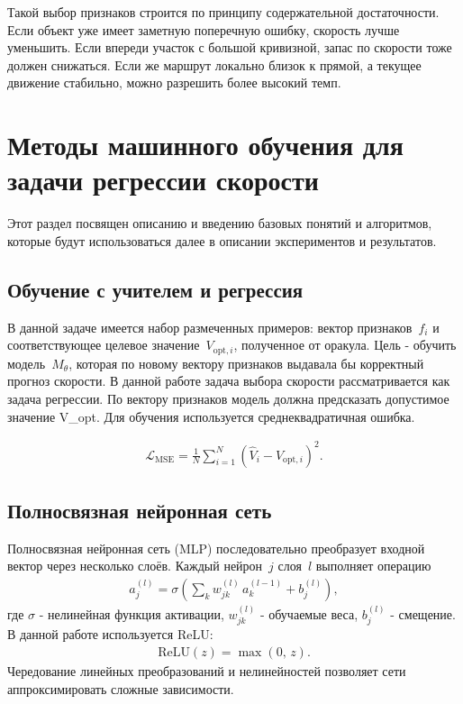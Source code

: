 Такой выбор признаков строится по принципу содержательной достаточности.
Если объект уже имеет заметную поперечную ошибку, скорость лучше уменьшить.
Если впереди участок с большой кривизной, запас по скорости тоже должен снижаться.
Если же маршрут локально близок к прямой, а текущее движение стабильно, можно разрешить более высокий темп.


\section{Методы машинного обучения для задачи регрессии скорости}

Этот раздел посвящен описанию и введению базовых понятий и алгоритмов, которые будут использоваться далее в описании экспериментов и результатов.

\subsection{Обучение с учителем и регрессия}

В данной задаче имеется набор размеченных примеров: вектор признаков~$f_i$ и соответствующее целевое значение~$V_{\mathrm{opt},i}$, полученное от оракула.
Цель - обучить модель~$M_\theta$, которая по новому вектору признаков выдавала бы корректный прогноз скорости.
В данной работе задача выбора скорости рассматривается как задача регрессии.
По вектору признаков модель должна предсказать допустимое значение V_{opt}.
Для обучения используется среднеквадратичная ошибка.

\begin{gather}
    \mathcal{L}_{\mathrm{MSE}} = \frac{1}{N}\sum_{i=1}^N \left(\hat{V}_i - V_{\mathrm{opt},i}\right)^2.
\end{gather}

\subsection{Полносвязная нейронная сеть}

Полносвязная нейронная сеть (MLP) последовательно преобразует входной вектор через несколько слоёв. Каждый нейрон~$j$ слоя~$l$ выполняет операцию
\begin{gather}
    a_j^{(l)} = \sigma\!\left(\sum_k w_{jk}^{(l)}\, a_k^{(l-1)} + b_j^{(l)}\right),
\end{gather}
где $\sigma$ - нелинейная функция активации, $w_{jk}^{(l)}$ - обучаемые веса, $b_j^{(l)}$ - смещение. В данной работе используется ReLU:
\begin{gather}
    \mathrm{ReLU}(z) = \max(0,\, z).
\end{gather}
Чередование линейных преобразований и нелинейностей позволяет сети аппроксимировать сложные зависимости.


